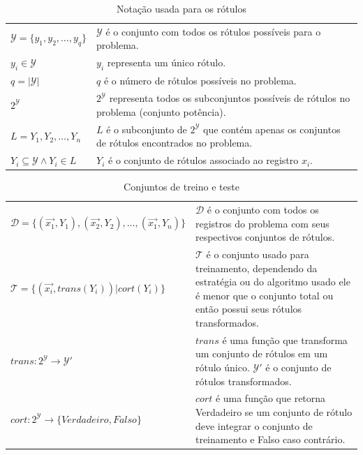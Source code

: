 \documentclass[runningheads,a4paper]{llncs}
\begin{document}
\begin{table}
	\centering
	\begin{tabular}{| >{\centering}p{4cm} | m{8cm} |}
		\hline	
		\multicolumn{2}{|c|}{\textit{Rótulos e conjuntos de rótulos}} \\
		\hline
		$\mathcal{Y} = \{y_1, y_2, \dots, y_q\}$ & $\mathcal{Y}$ é o conjunto com todos os rótulos possíveis para o problema. \\
		\hline
		$y_i \in \mathcal{Y}$ & $y_i$ representa um único rótulo. \\
		\hline
		$q = |\mathcal{Y}|$ & $q$ é o número de rótulos possíveis no problema. \\
		\hline
		$2^\mathcal{Y}$ & $2^\mathcal{Y}$ representa todos os subconjuntos possíveis de rótulos no problema (conjunto potência). \\
		\hline
		$L = {Y_1, Y_2, \dots, Y_n}$ & $L$ é o subconjunto de $2^\mathcal{Y}$ que contém apenas os conjuntos de rótulos encontrados no problema. \\
		\hline
		$Y_i \subseteq \mathcal{Y} \wedge Y_i \in L$ & $Y_i$ é o conjunto de rótulos associado ao registro $x_i$. \\
		\hline
	\end{tabular}
	\caption{Notação usada para os rótulos}
	\label{tab:matematica-rotulos}
\end{table}

\begin{table}
	\centering
	\begin{tabular}{| >{\centering}p{6cm} | m{6cm} |}
		\hline	
		\multicolumn{2}{|c|}{\textit{Conjuntos de treino e teste}} \\
		\hline
		$\mathcal{D} = \{(\vec{x_1}, Y_1), (\vec{x_2}, Y_2), \dots, (\vec{x_1}, Y_n)\}$ & $\mathcal{D}$ é o conjunto com todos os registros do problema com seus respectivos conjuntos de rótulos. \\
		\hline
		$\mathcal{T} = \{(\vec{x_i}, trans(Y_i)) | cort(Y_i) \}$ & $\mathcal{T}$ é o conjunto usado para treinamento, dependendo da estratégia ou do algoritmo usado ele é menor que o conjunto total ou então possui seus rótulos transformados. \\
		\hline
		$trans : 2^\mathcal{Y} \to \mathcal{Y'}$ & $trans$ é uma função que transforma um conjunto de rótulos em um rótulo único. $\mathcal{Y'}$ é o conjunto de rótulos transformados. \\
		\hline
		$cort : 2^\mathcal{Y} \to \{Verdadeiro, Falso\}$ & $cort$ é uma função que retorna Verdadeiro se um conjunto de rótulo deve integrar o conjunto de treinamento e Falso caso contrário. \\
		\hline
	\end{tabular}
	\caption{Conjuntos de treino e teste}
	\label{tab:matematica-dominio}
\end{table}
\end{document}
